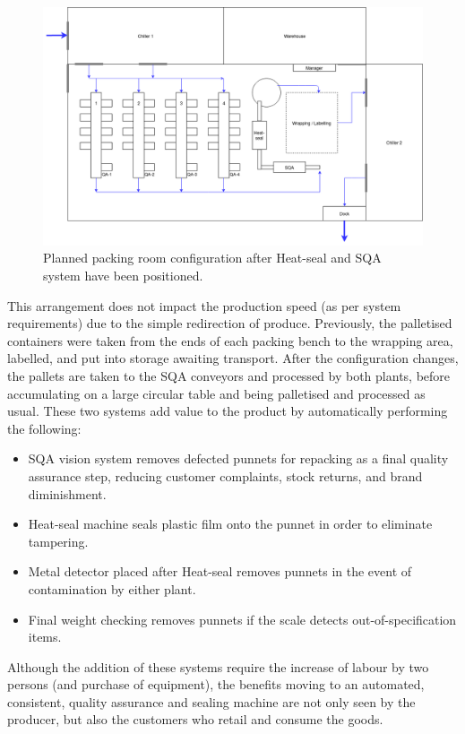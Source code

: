 \documentclass[fleqn,twoside,12pt]{report}
\begin{document}
\begin{figure}[h]
	\centering
	\includegraphics[width=.95\linewidth]{Pack_layout_2.png}
	\caption{Planned packing room configuration after Heat-seal and SQA system have been positioned.}
	\label{fig:pack_layout_2}
\end{figure}%


This arrangement does not impact the production speed (as per system requirements) due to the simple redirection of produce. Previously, the palletised containers were taken from the ends of each packing bench to the wrapping area, labelled, and put into storage awaiting transport. After the configuration changes, the pallets are taken to the SQA conveyors and processed by both plants, before accumulating on a large circular table and being palletised and processed as usual. These two systems add value to the product by automatically performing the following:

\begin{itemize}
	\item SQA vision system removes defected punnets for repacking as a final quality assurance step, reducing customer complaints, stock returns, and brand diminishment. 
	\item Heat-seal machine seals plastic film onto the punnet in order to eliminate tampering.
	\item Metal detector placed after Heat-seal removes punnets in the event of contamination by either plant.
	\item Final weight checking removes punnets if the scale detects out-of-specification items.
\end{itemize}  


Although the addition of these systems require the increase of labour by two persons (and purchase of equipment), the benefits moving to an automated, consistent, quality assurance and sealing machine are not only seen by the producer, but also the customers who retail and consume the goods.
\end{document}
